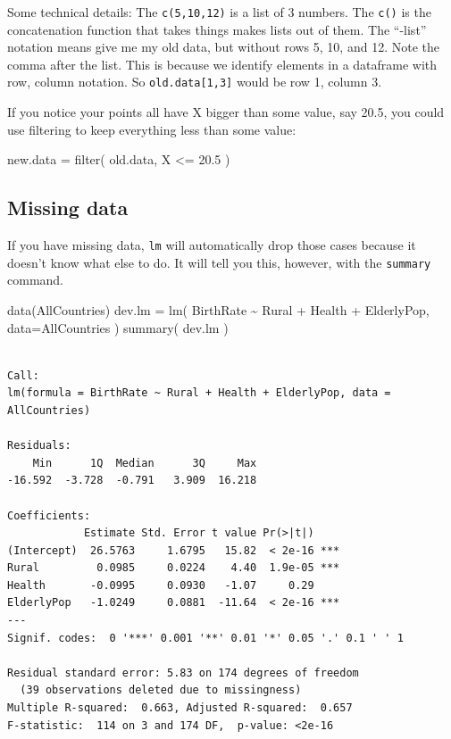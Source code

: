 \documentclass[
  letterpaper,
  DIV=11,
  numbers=noendperiod]{scrreprt}
\newenvironment{Shaded}{\begin{snugshade}}{\end{snugshade}}
\newcommand{\AttributeTok}[1]{\textcolor[rgb]{0.49,0.56,0.16}{#1}}
\newcommand{\FloatTok}[1]{\textcolor[rgb]{0.25,0.63,0.44}{#1}}
\newcommand{\FunctionTok}[1]{\textcolor[rgb]{0.02,0.16,0.49}{#1}}
\newcommand{\NormalTok}[1]{\textcolor[rgb]{0.00,0.44,0.13}{#1}}
\newcommand{\OtherTok}[1]{\textcolor[rgb]{0.00,0.44,0.13}{#1}}
\newcommand{\SpecialCharTok}[1]{\textcolor[rgb]{0.25,0.44,0.63}{#1}}
\begin{document}
Some technical details: The \texttt{c(5,10,12)} is a list of 3 numbers.
The \texttt{c()} is the concatenation function that takes things makes
lists out of them. The ``-list'' notation means give me my old data, but
without rows 5, 10, and 12. Note the comma after the list. This is
because we identify elements in a dataframe with row, column notation.
So \texttt{old.data{[}1,3{]}} would be row 1, column 3.

If you notice your points all have X bigger than some value, say 20.5,
you could use filtering to keep everything less than some value:

\begin{Shaded}
\begin{Highlighting}[]
\NormalTok{new.data }\OtherTok{=} \FunctionTok{filter}\NormalTok{( old.data, X }\SpecialCharTok{\textless{}=} \FloatTok{20.5}\NormalTok{ )}
\end{Highlighting}
\end{Shaded}

\hypertarget{missing-data}{%
\subsection{Missing data}\label{missing-data}}

If you have missing data, \texttt{lm} will automatically drop those
cases because it doesn't know what else to do. It will tell you this,
however, with the \texttt{summary} command.

\begin{Shaded}
\begin{Highlighting}[]
\FunctionTok{data}\NormalTok{(AllCountries)}
\NormalTok{dev.lm }\OtherTok{=} \FunctionTok{lm}\NormalTok{( BirthRate }\SpecialCharTok{\textasciitilde{}}\NormalTok{ Rural }\SpecialCharTok{+}\NormalTok{ Health }\SpecialCharTok{+}\NormalTok{ ElderlyPop, }\AttributeTok{data=}\NormalTok{AllCountries )}
\FunctionTok{summary}\NormalTok{( dev.lm  )}
\end{Highlighting}
\end{Shaded}

\begin{verbatim}

Call:
lm(formula = BirthRate ~ Rural + Health + ElderlyPop, data = AllCountries)

Residuals:
    Min      1Q  Median      3Q     Max 
-16.592  -3.728  -0.791   3.909  16.218 

Coefficients:
            Estimate Std. Error t value Pr(>|t|)    
(Intercept)  26.5763     1.6795   15.82  < 2e-16 ***
Rural         0.0985     0.0224    4.40  1.9e-05 ***
Health       -0.0995     0.0930   -1.07     0.29    
ElderlyPop   -1.0249     0.0881  -11.64  < 2e-16 ***
---
Signif. codes:  0 '***' 0.001 '**' 0.01 '*' 0.05 '.' 0.1 ' ' 1

Residual standard error: 5.83 on 174 degrees of freedom
  (39 observations deleted due to missingness)
Multiple R-squared:  0.663, Adjusted R-squared:  0.657 
F-statistic:  114 on 3 and 174 DF,  p-value: <2e-16
\end{verbatim}
\end{document}
